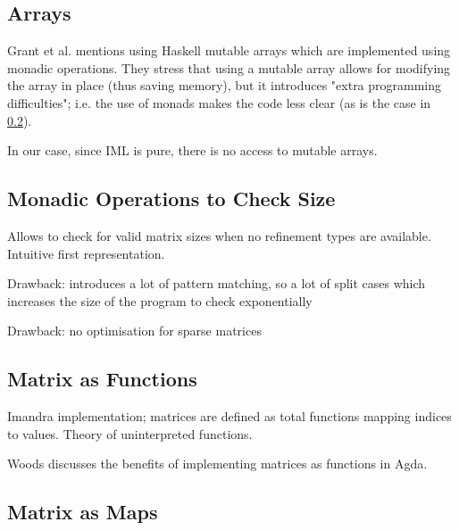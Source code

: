 \documentclass[runningheads]{llncs}
\begin{document}
\subsection{Arrays}
Grant et al. \cite{grant_sparse_1996} mentions using Haskell mutable arrays which are implemented using monadic operations. They stress that using a mutable array allows for modifying the array in place (thus saving memory), but it introduces "extra programming difficulties"; i.e. the use of monads makes the code less clear (as is the case in \ref{subs:monads}). 

In our case, since IML is pure, there is no access to mutable arrays.

\subsection{Monadic Operations to Check Size} \label{subs:monads}
Allows to check for valid matrix sizes when no refinement types are available. Intuitive first representation.

Drawback: introduces a lot of pattern matching, so a lot of split cases which increases the size of the program to check exponentially

Drawback: no optimisation for sparse matrices

\subsection{Matrix as Functions}
Imandra implementation; matrices are defined as total functions mapping indices to values.
Theory of uninterpreted functions.

Woods \cite{wood_vectors_2019} discusses the benefits of implementing matrices as functions in Agda.

\subsection{Matrix as Maps}

%
%
%


\end{document}
